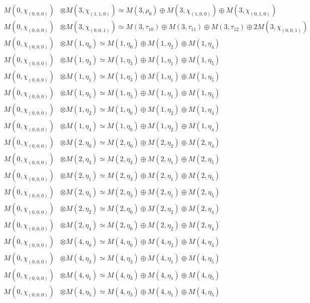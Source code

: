 \begin{align*}
M(0,\chi_{(0,0,0)}) &\otimes M(3,\chi_{(1,1,0)}) \simeq M(3,\rho_{0}) \oplus M(3,\chi_{(1,0,0)}) \oplus M(3,\chi_{(0,1,0)})\\
M(0,\chi_{(0,0,0)}) &\otimes M(3,\chi_{(0,0,1)}) \simeq M(3,\tau_{10}) \oplus M(3,\tau_{11}) \oplus M(3,\tau_{12}) \oplus 2 M(3,\chi_{(0,0,1)})\\
M(0,\chi_{(0,0,0)}) &\otimes M(1,\eta_{0}) \simeq M(1,\eta_{0}) \oplus M(1,\eta_{2}) \oplus M(1,\eta_{4})\\
M(0,\chi_{(0,0,0)}) &\otimes M(1,\eta_{3}) \simeq M(1,\eta_{3}) \oplus M(1,\eta_{1}) \oplus M(1,\eta_{5})\\
M(0,\chi_{(0,0,0)}) &\otimes M(1,\eta_{1}) \simeq M(1,\eta_{3}) \oplus M(1,\eta_{1}) \oplus M(1,\eta_{5})\\
M(0,\chi_{(0,0,0)}) &\otimes M(1,\eta_{5}) \simeq M(1,\eta_{3}) \oplus M(1,\eta_{1}) \oplus M(1,\eta_{5})\\
M(0,\chi_{(0,0,0)}) &\otimes M(1,\eta_{2}) \simeq M(1,\eta_{0}) \oplus M(1,\eta_{2}) \oplus M(1,\eta_{4})\\
M(0,\chi_{(0,0,0)}) &\otimes M(1,\eta_{4}) \simeq M(1,\eta_{0}) \oplus M(1,\eta_{2}) \oplus M(1,\eta_{4})\\
M(0,\chi_{(0,0,0)}) &\otimes M(2,\eta_{0}) \simeq M(2,\eta_{0}) \oplus M(2,\eta_{2}) \oplus M(2,\eta_{4})\\
M(0,\chi_{(0,0,0)}) &\otimes M(2,\eta_{3}) \simeq M(2,\eta_{3}) \oplus M(2,\eta_{1}) \oplus M(2,\eta_{5})\\
M(0,\chi_{(0,0,0)}) &\otimes M(2,\eta_{1}) \simeq M(2,\eta_{3}) \oplus M(2,\eta_{1}) \oplus M(2,\eta_{5})\\
M(0,\chi_{(0,0,0)}) &\otimes M(2,\eta_{5}) \simeq M(2,\eta_{3}) \oplus M(2,\eta_{1}) \oplus M(2,\eta_{5})\\
M(0,\chi_{(0,0,0)}) &\otimes M(2,\eta_{2}) \simeq M(2,\eta_{0}) \oplus M(2,\eta_{2}) \oplus M(2,\eta_{4})\\
M(0,\chi_{(0,0,0)}) &\otimes M(2,\eta_{4}) \simeq M(2,\eta_{0}) \oplus M(2,\eta_{2}) \oplus M(2,\eta_{4})\\
M(0,\chi_{(0,0,0)}) &\otimes M(4,\eta_{0}) \simeq M(4,\eta_{0}) \oplus M(4,\eta_{2}) \oplus M(4,\eta_{4})\\
M(0,\chi_{(0,0,0)}) &\otimes M(4,\eta_{3}) \simeq M(4,\eta_{3}) \oplus M(4,\eta_{1}) \oplus M(4,\eta_{5})\\
M(0,\chi_{(0,0,0)}) &\otimes M(4,\eta_{1}) \simeq M(4,\eta_{3}) \oplus M(4,\eta_{1}) \oplus M(4,\eta_{5})\\
M(0,\chi_{(0,0,0)}) &\otimes M(4,\eta_{5}) \simeq M(4,\eta_{3}) \oplus M(4,\eta_{1}) \oplus M(4,\eta_{5})\\

\end{align*}
